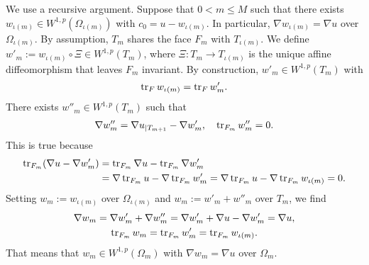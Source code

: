 \documentclass[a4paper]{article}
\begin{document}
    We use a recursive argument.
    Suppose that $0 < m \leq M$ such that there exists $w_{\iota(m)} \in W^{1,p}(\Omega_{\iota(m)})$ with $c_{0} = u - w_{\iota(m)}$.
    In particular, $\nabla w_{\iota(m)} = \nabla u$ over $\Omega_{\iota(m)}$. 
    By assumption, $T_{m}$ shares the face $F_{m}$ with $T_{\iota(m)}$. 
    We define $w'_{m} := w_{\iota(m)} \circ \Xi \in W^{1,p}(T_{m})$,
    where $\Xi : T_{m} \rightarrow T_{\iota(m)}$ is the unique affine diffeomorphism that leaves $F_{m}$ invariant. 
    By construction, $w'_{m} \in W^{1,p}(T_{m})$ with 
    \begin{align*}
        \operatorname{tr}_F w_{\iota(m)} = \operatorname{tr}_F w'_{m}
        .
    \end{align*}
    There exists $w''_{m} \in W^{1,p}(T_{m})$ such that 
    \begin{align*}
        \nabla w''_{m} = \nabla u_{|T_{m+1}} - \nabla w'_{m}, 
        \quad 
        \operatorname{tr}_{F_{m}} w''_{m} = 0.
    \end{align*}
    This is true because 
    \begin{align*}
        \operatorname{tr}_{F_{m}}( \nabla u - \nabla w'_{m} ) 
        &= 
        \operatorname{tr}_{F_{m}} \nabla u - \operatorname{tr}_{F_{m}} \nabla w'_{m}
        \\&= 
        \nabla \operatorname{tr}_{F_{m}} u - \nabla \operatorname{tr}_{F_{m}} w'_{m}
        = 
        \nabla \operatorname{tr}_{F_{m}} u - \nabla \operatorname{tr}_{F_{m}} w_{\iota(m)}
        = 
        0
        .
    \end{align*}
    Setting $w_{m} := w_{\iota(m)}$ over $\Omega_{\iota(m)}$ and $w_{m} := w'_{m} + w''_{m}$ over $T_{m}$, 
    we find 
    \begin{gather*}
        \nabla w_{m} = \nabla w'_{m} + \nabla w''_{m} = \nabla w'_{m} + \nabla u - \nabla w'_{m} = \nabla u,
        \\
        \operatorname{tr}_{F_{m}} w_{m} = \operatorname{tr}_{F_{m}} w'_{m} = \operatorname{tr}_{F_{m}} w_{\iota(m)}.
    \end{gather*}
    That means that $w_{m} \in W^{1,p}(\Omega_{m})$ with $\nabla w_{m} = \nabla u$ over $\Omega_{m}$. 
\end{document}
